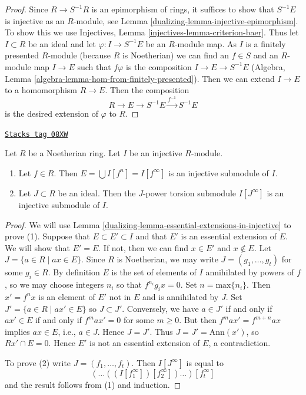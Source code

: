 \begin{proof}

Since $R \to S^{-1}R$ is an epimorphism of rings, it suffices
to show that $S^{-1}E$ is injective as an $R$-module, see
Lemma \ref{dualizing-lemma-injective-epimorphism}.
To show this we use Injectives, Lemma \ref{injectives-lemma-criterion-baer}.
Thus let $I \subset R$ be an ideal and let
$\varphi : I \to S^{-1} E$ be an $R$-module map.
As $I$ is a finitely presented $R$-module (because $R$ is Noetherian)
we can find an $f \in S$ and an $R$-module map $I \to E$
such that $f\varphi$ is the composition $I \to E \to S^{-1}E$
(Algebra, Lemma \ref{algebra-lemma-hom-from-finitely-presented}).
Then we can extend $I \to E$ to a homomorphism $R \to E$.
Then the composition
$$
R \to E \to S^{-1}E \xrightarrow{f^{-1}} S^{-1}E
$$
is the desired extension of $\varphi$ to $R$.
\end{proof}

\begin{lemma}
\label{dualizing-lemma-injective-module-divide}
\href{https://stacks.math.columbia.edu/tag/08XW}{\texttt{Stacks tag 08XW}}

Let $R$ be a Noetherian ring. Let $I$ be an injective $R$-module.
\begin{enumerate}
\item Let $f \in R$. Then $E = \bigcup I[f^n] = I[f^\infty]$
is an injective submodule of $I$.
\item Let $J \subset R$ be an ideal. Then the $J$-power torsion
submodule $I[J^\infty]$ is an injective submodule of $I$.
\end{enumerate}
\end{lemma}

\begin{proof}

We will use Lemma \ref{dualizing-lemma-essential-extensions-in-injective}
to prove (1).
Suppose that $E \subset E' \subset I$ and that $E'$ is an essential
extension of $E$. We will show that $E' = E$. If not, then we can
find $x \in E'$ and $x \not \in E$.
Let $J = \{ a \in R \mid ax \in E\}$. Since $R$ is Noetherian,
we may write $J = (g_1, \ldots, g_t)$ for some
$g_i \in R$. By definition $E$ is the set of elements of $I$ annihilated
by powers of $f$, so we may choose integers $n_i$ so that $f^{n_i}g_ix = 0$.
Set $n = \mathrm{max}\{ n_i \}$. Then $x' = f^n x$ is an element of $E'$
not in $E$ and is annihilated by $J$. Set $J' = \{ a \in R \mid ax' \in E \}$
so $J \subset J'$. Conversely, we have $a \in J'$ if and only if $ax' \in E$
if and only if $f^m a x' = 0$ for some $m \geq 0$. But then
$f^m a x' = f^{m + n} a x$ implies $ax \in E$, i.e., $a \in J$.
Hence $J = J'$. Thus $J = J' = \text{Ann}(x')$, so $Rx' \cap E  = 0$.
Hence $E'$ is not an essential extension of $E$, a contradiction.

\medskip\noindent
To prove (2) write $J = (f_1, \ldots, f_t)$. Then
$I[J^\infty]$ is equal to
$$
(\ldots((I[f_1^\infty])[f_2^\infty])\ldots)[f_t^\infty]
$$
and the result follows from (1) and induction.
\end{proof}

